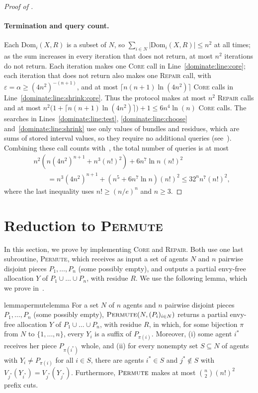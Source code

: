 \documentclass[11pt]{article}
\newcommand{\eps}{\varepsilon}
\newcommand{\Core}{\textsc{Core}}
\newcommand{\Repair}{\textsc{Repair}}
\newcommand{\Dom}{\mathrm{Dom}}
\newcommand{\Permute}{\textsc{Permute}}
\theoremstyle{plain}
\theoremstyle{definition}
\theoremstyle{plain}
\begin{document}
\begin{proof}[Proof of ]
\paragraph{Termination and query count.}
Each $\Dom_i(X,R)$ is a subset of $N$, so $\sum_{i\in N}|\Dom_i(X,R)|\le n^2$ at all times; as the sum increases in every iteration that does not return, at most $n^2$ iterations do not return. Each iteration makes one \Core{} call in Line~\ref{dominate:line:core}; each iteration that does not return also makes one \Repair{} call, with $\eps=\alpha\ge(4n^2)^{-(n+1)}$, and at most $\lceil n(n+1)\ln(4n^2)\rceil$ \Core{} calls in Line~\ref{dominate:line:shrink:core}. Thus the protocol makes at most $n^2$ \Repair{} calls and at most $n^2\bigl(1+\lceil n(n+1)\ln(4n^2)\rceil\bigr)+1 \leq 6 n^4 \ln(n)$ \Core{} calls. The searches in Lines~\ref{dominate:line:test}, \ref{dominate:line:choose} and~\ref{dominate:line:shrink} use only values of bundles and residues, which are sums of stored interval values, so they require no additional queries (see~). Combining these call counts with~, the total number of queries is at most
\begin{align*}
&n^2\left(n(4n^2)^{n+1}+n^3(n!)^2\right)
 +6n^7\ln n\,(n!)^2\\
&\qquad=n^3(4n^2)^{n+1}
 +(n^5+6n^7\ln n)(n!)^2
 \le 32^n n^7(n!)^2,
\end{align*}
where the last inequality uses $n!\ge(n/e)^n$ and $n\ge3$.
\end{proof}

\section{Reduction to \Permute}\label{sec:core and repair}

In this section, we prove  by implementing \Core{} and \Repair. Both use one last subroutine, \Permute, which receives as input a set of agents $N$ and $n$ pairwise disjoint pieces $P_1,\dots,P_n$ (some possibly empty), and outputs a partial envy-free allocation $Y$ of $P_1\cup\dots\cup P_n$, with residue $R$. We use the following lemma, which we prove in~.

\begin{restatable}{lemma}{permutelemma}\label{lem:permute}
For a set $N$ of $n$ agents and $n$ pairwise disjoint pieces $P_1,\dots,P_n$ (some possibly empty), $\Permute(N,(P_i)_{i \in N})$ returns a partial envy-free allocation $Y$ of $P_1\cup\dots\cup P_n$, with residue $R$, in which, for some bijection $\pi$ from $N$ to $\{1,\dots,n\}$, every $Y_i$ is a suffix of $P_{\pi(i)}$. Moreover, (i) some agent $i^*$ receives her piece $P_{\pi(i^*)}$ whole, and (ii) for every nonempty set $S\subseteq N$ of agents with $Y_i \ne P_{\pi(i)}$ for all $i \in S$, there are agents $i^* \in S$ and $j^* \notin S$ with $V_{j^*}(Y_{i^*})=V_{j^*}(Y_{j^*})$. Furthermore, $\Permute{}$ makes at most $\binom n2(n!)^2$ prefix cuts.
\end{restatable}
\end{document}
